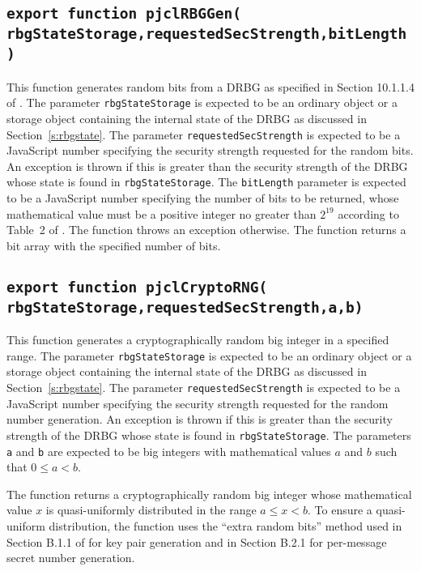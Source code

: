 \documentclass[12pt]{article}
\begin{document}
\subsection{\tt export function pjclRBGGen(\\\mbox{}\hspace{.2in}rbgStateStorage,requestedSecStrength,bitLength)}

This function generates random bits from a DRBG as
specified in Section 10.1.1.4 of \cite{SP800-90Ar1}.
The parameter {\tt rbgStateStorage} is expected to be an ordinary
object or a storage object containing the internal state of the DRBG 
as discussed in Section~\ref{s:rbgstate}.
The parameter {\tt requestedSecStrength} is expected to be a
JavaScript number specifying the security strength requested for
the random bits.  An exception is thrown if this is greater
than the security strength of the DRBG whose state is found in 
{\tt rbgStateStorage}.
The {\tt bitLength} parameter is expected to be a JavaScript number
specifying the number of bits to be returned, whose mathematical value must be a positive integer no greater
than $2^{19}$ according to Table~2 of \cite{SP800-90Ar1}.  The
function throws an exception otherwise.
The function returns a bit array with the specified number of bits.

\subsection{\tt export function pjclCryptoRNG(\\\mbox{}\hspace{.2in}rbgStateStorage,requestedSecStrength,a,b)}

This function generates a cryptographically random big integer
in a specified range.
The parameter {\tt rbgStateStorage} is expected to be an ordinary
object or a storage object containing the internal state of the DRBG 
as discussed in Section~\ref{s:rbgstate}.
The parameter {\tt requestedSecStrength} is expected to be a
JavaScript number specifying the security strength requested for
the random number generation.  An exception is thrown if this is greater
than the security strength of the DRBG whose state is found in 
{\tt rbgStateStorage}.
The parameters
{\tt a} and {\tt b} are expected to be big integers with mathematical
values $a$ and $b$ such that $0 \leq a < b$.  

The function returns a
cryptographically random big integer whose mathematical value $x$ is
quasi-uniformly distributed in the range $a \leq x < b$.  To ensure a
quasi-uniform distribution, the function uses the ``extra random
bits'' method used in Section B.1.1 of \cite{DSS-4} for key pair
generation and in Section B.2.1 for per-message secret number
generation.
\end{document}
